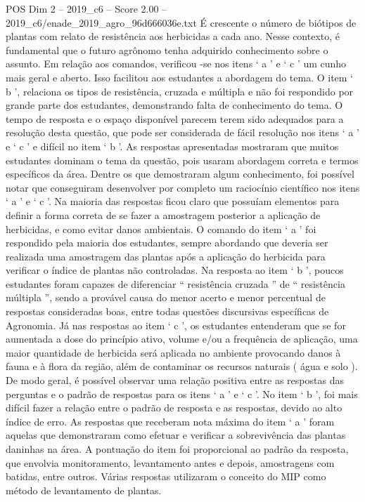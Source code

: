 \begin{textsample}{POS Dim 2 – 2019\_c6 – Score 2.00 – 2019\_c6/enade\_2019\_agro\_96d666036e.txt}
É crescente o número de biótipos de plantas com relato de resistência aos herbicidas a cada ano.
Nesse contexto, é fundamental que o futuro agrônomo tenha adquirido conhecimento sobre o assunto.
Em relação aos comandos, verificou -se nos itens ‘ a ’ e ‘ c ’ um cunho mais geral e aberto.
Isso facilitou aos estudantes a abordagem do tema.
O item ‘ b ’, relaciona os tipos de resistência, cruzada e múltipla e não foi respondido por grande parte dos estudantes, demonstrando falta de conhecimento do tema.
O tempo de resposta e o espaço disponível parecem terem sido adequados para a resolução desta questão, que pode ser considerada de fácil resolução nos itens ‘ a ’ e ‘ c ’ e difícil no item ‘ b ’.
As respostas apresentadas mostraram que muitos estudantes dominam o tema da questão, pois usaram abordagem correta e termos específicos da área.
Dentre os que demostraram algum conhecimento, foi possível notar que conseguiram desenvolver por completo um raciocínio científico nos itens ‘ a ’ e ‘ c ’.
Na maioria das respostas ficou claro que possuíam elementos para definir a forma correta de se fazer a amostragem posterior a aplicação de herbicidas, e como evitar danos ambientais.
O comando do item ‘ a ’ foi respondido pela maioria dos estudantes, sempre abordando que deveria ser realizada uma amostragem das plantas após a aplicação do herbicida para verificar o índice de plantas não controladas.
Na resposta ao item ‘ b ’, poucos estudantes foram capazes de diferenciar “ resistência cruzada ” de “ resistência múltipla ”, sendo a provável causa do menor acerto e menor percentual de respostas consideradas boas, entre todas questões discursivas específicas de Agronomia.
Já nas respostas ao item ‘ c ’, os estudantes entenderam que se for aumentada a dose do princípio ativo, volume e/ou a frequência de aplicação, uma maior quantidade de herbicida será aplicada no ambiente provocando danos à fauna e à flora da região, além de contaminar os recursos naturais ( água e solo ).
De modo geral, é possível observar uma relação positiva entre as respostas das perguntas e o padrão de respostas para os itens ‘ a ’ e ‘ c ’.
No item ‘ b ’, foi mais difícil fazer a relação entre o padrão de resposta e as respostas, devido ao alto índice de erro.
As respostas que receberam nota máxima do item ‘ a ’ foram aquelas que demonstraram como efetuar e verificar a sobrevivência das plantas daninhas na área.
A pontuação do item foi proporcional ao padrão da resposta, que envolvia monitoramento, levantamento antes e depois, amostragens com batidas, entre outros.
Várias respostas utilizaram o conceito do MIP como método de levantamento de plantas.

\end{textsample}
